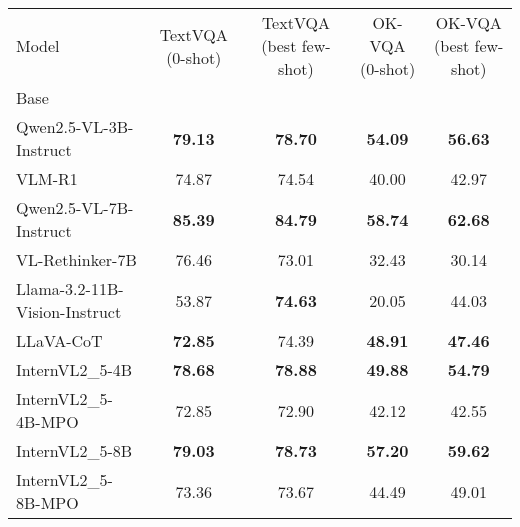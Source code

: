 \begin{table}[!h]
\centering
\small
\begin{tabular}{lcccc}
Model & TextVQA (0-shot) & TextVQA (best few-shot) & OK-VQA (0-shot) & OK-VQA (best few-shot) \\
Base &  &  &  &  \\
Qwen2.5-VL-3B-Instruct & \textbf{79.13} & \textbf{78.70} & \textbf{54.09} & \textbf{56.63} \\
VLM-R1 & 74.87 & 74.54 & 40.00 & 42.97 \\
Qwen2.5-VL-7B-Instruct & \textbf{85.39} & \textbf{84.79} & \textbf{58.74} & \textbf{62.68} \\
VL-Rethinker-7B & 76.46 & 73.01 & 32.43 & 30.14 \\
Llama-3.2-11B-Vision-Instruct & 53.87 & \textbf{74.63} & 20.05 & 44.03 \\
LLaVA-CoT & \textbf{72.85} & 74.39 & \textbf{48.91} & \textbf{47.46} \\
InternVL2\_5-4B & \textbf{78.68} & \textbf{78.88} & \textbf{49.88} & \textbf{54.79} \\
InternVL2\_5-4B-MPO & 72.85 & 72.90 & 42.12 & 42.55 \\
InternVL2\_5-8B & \textbf{79.03} & \textbf{78.73} & \textbf{57.20} & \textbf{59.62} \\
InternVL2\_5-8B-MPO & 73.36 & 73.67 & 44.49 & 49.01 \\
\end{tabular}
\end{table}